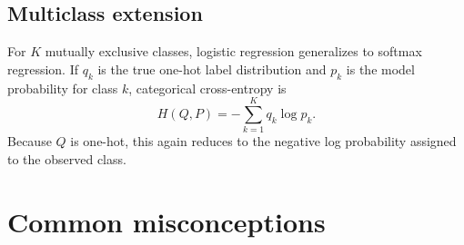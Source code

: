 \documentclass[11pt]{article}
\theoremstyle{definition}
\begin{document}
\subsection{Multiclass extension}

For $K$ mutually exclusive classes, logistic regression generalizes to softmax regression. If $q_k$ is the true one-hot label distribution and $p_k$ is the model probability for class $k$, categorical cross-entropy is
\[
H(Q,P)=-\sum_{k=1}^{K}q_k\log p_k.
\]
Because $Q$ is one-hot, this again reduces to the negative log probability assigned to the observed class.

\section{Common misconceptions}
\end{document}

